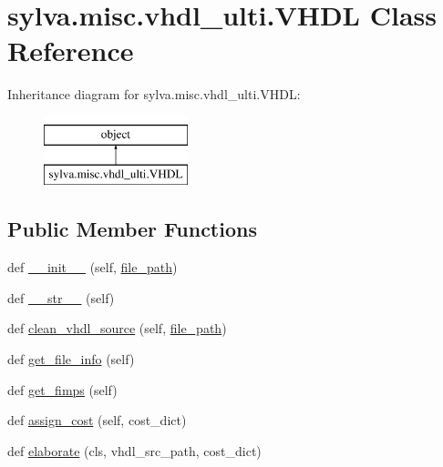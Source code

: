 \hypertarget{classsylva_1_1misc_1_1vhdl__ulti_1_1_v_h_d_l}{}\section{sylva.\+misc.\+vhdl\+\_\+ulti.\+V\+H\+DL Class Reference}
\label{classsylva_1_1misc_1_1vhdl__ulti_1_1_v_h_d_l}
Inheritance diagram for sylva.\+misc.\+vhdl\+\_\+ulti.\+V\+H\+DL\+:\begin{figure}[H]
\begin{center}
\leavevmode
\includegraphics[height=2.000000cm]{classsylva_1_1misc_1_1vhdl__ulti_1_1_v_h_d_l}
\end{center}
\end{figure}
\subsection*{Public Member Functions}
\begin{DoxyCompactItemize}
\item 
def \hyperlink{classsylva_1_1misc_1_1vhdl__ulti_1_1_v_h_d_l_a5eac6d4ee2354babf62a07b7f83d94e7}{\+\_\+\+\_\+init\+\_\+\+\_\+} (self, \hyperlink{classsylva_1_1misc_1_1vhdl__ulti_1_1_v_h_d_l_a04b9fc97616c0decf89e5bc36fdbf879}{file\+\_\+path})
\item 
def \hyperlink{classsylva_1_1misc_1_1vhdl__ulti_1_1_v_h_d_l_a2a6786cbe721ea37e8ada800f5787ba4}{\+\_\+\+\_\+str\+\_\+\+\_\+} (self)
\item 
def \hyperlink{classsylva_1_1misc_1_1vhdl__ulti_1_1_v_h_d_l_a9069beffb43ba444c7aa61902dcff236}{clean\+\_\+vhdl\+\_\+source} (self, \hyperlink{classsylva_1_1misc_1_1vhdl__ulti_1_1_v_h_d_l_a04b9fc97616c0decf89e5bc36fdbf879}{file\+\_\+path})
\item 
def \hyperlink{classsylva_1_1misc_1_1vhdl__ulti_1_1_v_h_d_l_ad90cd226a1be4574ec7fe86b84f9e959}{get\+\_\+file\+\_\+info} (self)
\item 
def \hyperlink{classsylva_1_1misc_1_1vhdl__ulti_1_1_v_h_d_l_a30c77e530f564a64c316e514a22443eb}{get\+\_\+fimps} (self)
\item 
def \hyperlink{classsylva_1_1misc_1_1vhdl__ulti_1_1_v_h_d_l_ad7c048b801d2a2259246cf8d08d37fab}{assign\+\_\+cost} (self, cost\+\_\+dict)
\item 
def \hyperlink{classsylva_1_1misc_1_1vhdl__ulti_1_1_v_h_d_l_a4e4bd98f12b587f047259934db24a2b2}{elaborate} (cls, vhdl\+\_\+src\+\_\+path, cost\+\_\+dict)
\end{DoxyCompactItemize}
